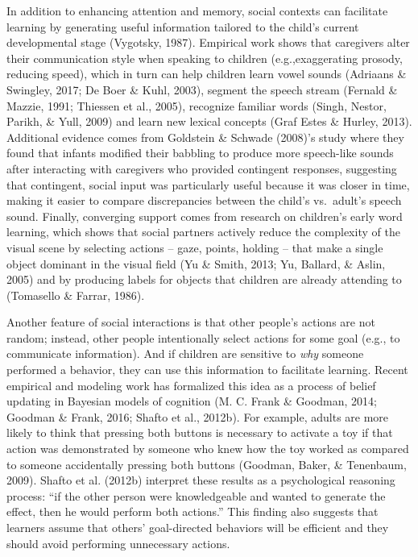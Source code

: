 \documentclass[oneside]{report}
\begin{document}
In addition to enhancing attention and memory, social contexts can
facilitate learning by generating useful information tailored to the
child's current developmental stage (Vygotsky, 1987). Empirical work
shows that caregivers alter their communication style when speaking to
children (e.g.,exaggerating prosody, reducing speed), which in turn can
help children learn vowel sounds (Adriaans \& Swingley, 2017; De Boer \&
Kuhl, 2003), segment the speech stream (Fernald \& Mazzie, 1991;
Thiessen et al., 2005), recognize familiar words (Singh, Nestor, Parikh,
\& Yull, 2009) and learn new lexical concepts (Graf Estes \& Hurley,
2013). Additional evidence comes from Goldstein \& Schwade (2008)'s
study where they found that infants modified their babbling to produce
more speech-like sounds after interacting with caregivers who provided
contingent responses, suggesting that contingent, social input was
particularly useful because it was closer in time, making it easier to
compare discrepancies between the child's vs.~adult's speech sound.
Finally, converging support comes from research on children's early word
learning, which shows that social partners actively reduce the
complexity of the visual scene by selecting actions -- gaze, points,
holding -- that make a single object dominant in the visual field (Yu \&
Smith, 2013; Yu, Ballard, \& Aslin, 2005) and by producing labels for
objects that children are already attending to (Tomasello \& Farrar,
1986).

Another feature of social interactions is that other people's actions
are not random; instead, other people intentionally select actions for
some goal (e.g., to communicate information). And if children are
sensitive to \emph{why} someone performed a behavior, they can use this
information to facilitate learning. Recent empirical and modeling work
has formalized this idea as a process of belief updating in Bayesian
models of cognition (M. C. Frank \& Goodman, 2014; Goodman \& Frank,
2016; Shafto et al., 2012b). For example, adults are more likely to
think that pressing both buttons is necessary to activate a toy if that
action was demonstrated by someone who knew how the toy worked as
compared to someone accidentally pressing both buttons (Goodman, Baker,
\& Tenenbaum, 2009). Shafto et al. (2012b) interpret these results as a
psychological reasoning process: ``if the other person were
knowledgeable and wanted to generate the effect, then he would perform
both actions.'' This finding also suggests that learners assume that
others' goal-directed behaviors will be efficient and they should avoid
performing unnecessary actions.
\end{document}
